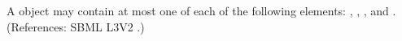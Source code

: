 A \Reaction object may contain at most one of each of the following
elements: , ,
, and .  (References: SBML L3V2
.)
